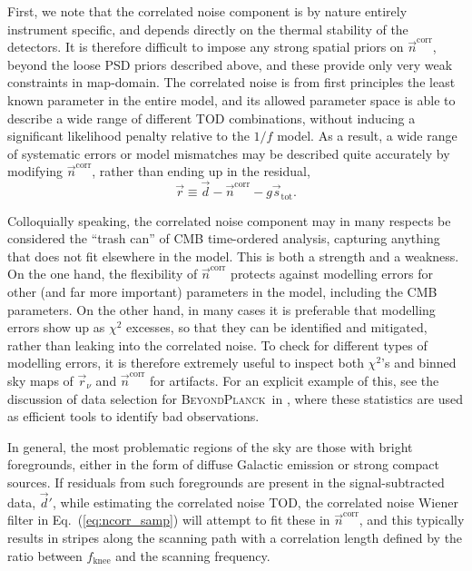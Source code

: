 \documentclass[twocolumn]{aa}
\renewcommand{\d}[0]{\vec{d}}
\newcommand{\n}[0]{\vec{n}}
\renewcommand{\r}[0]{\vec{r}}
\newcommand{\BP}{\textsc{BeyondPlanck}}
\begin{document}
First, we note that the correlated noise component is by nature
entirely instrument specific, and depends directly on the thermal
stability of the detectors. It is therefore difficult to impose any
strong spatial priors on $\n^{\mathrm{corr}}$, beyond the loose PSD
priors described above, and these provide only very weak
constraints in map-domain. The correlated noise is from first
principles the least known parameter in the
entire model, and its allowed parameter space is able to describe a
wide range of different TOD combinations, without inducing a
significant likelihood penalty relative to the $1/f$ model. As a
result, a wide range of systematic errors or model mismatches may be
described quite accurately by modifying $\vec{n}^\mathrm{corr}$,
rather than ending up in the residual,
\begin{equation}
  \r \equiv \vec{d} - \vec{n}^\mathrm{corr}
  - g\vec{s}_\mathrm{tot}.
  \label{eq:residual}
\end{equation}

Colloquially speaking, the correlated noise component may in many
respects be considered the ``trash can'' of CMB time-ordered analysis,
capturing anything that does not fit elsewhere in the model. This is
both a strength and a weakness. On the one hand, the flexibility of
$\n^{\mathrm{corr}}$ protects against modelling errors for other (and
far more important) parameters in the model, including the CMB
parameters. On the other hand, in many cases it is preferable that
modelling errors show up as $\chi^2$ excesses, so that they can
be identified and mitigated, rather than leaking into the correlated
noise. To check for different types of modelling errors, it is
therefore extremely useful to inspect both $\chi^2$'s and binned sky
maps of $\r_\nu$ and $\n^{\mathrm{corr}}$ for artifacts. For an
explicit example of this, see the discussion of data selection for
\BP\ in \citet{bp13}, where these statistics are used as efficient
tools to identify bad observations.

In general, the most problematic regions of the sky are those with
bright foregrounds, either in the form of diffuse Galactic emission or
strong compact sources. If residuals from such foregrounds are present
in the signal-subtracted data, $\d'$, while estimating the correlated
noise TOD, the correlated noise Wiener filter in
Eq.~(\ref{eq:ncorr_samp}) will attempt to fit these in
$\n^{\mathrm{corr}}$, and this typically results in stripes along the
scanning path with a correlation length defined by the ratio between
$f_\mathrm{knee}$ and the scanning frequency.
\end{document}
